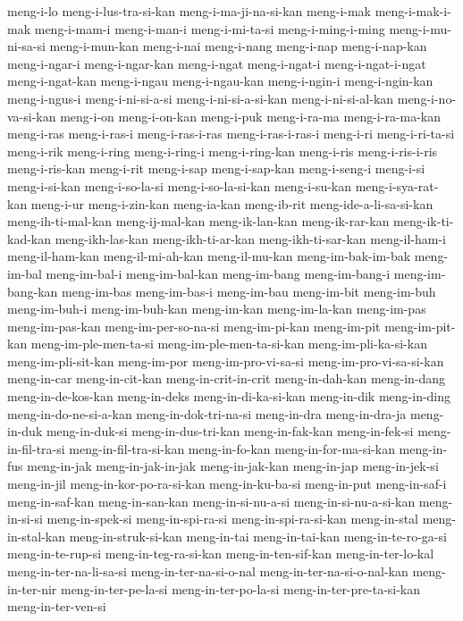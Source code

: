 {meng-i-lo meng-i-lus-tra-si-kan meng-i-ma-ji-na-si-kan meng-i-mak
meng-i-mak-i-mak meng-i-mam-i meng-i-man-i meng-i-mi-ta-si
meng-i-ming-i-ming meng-i-mu-ni-sa-si meng-i-mun-kan meng-i-nai
meng-i-nang meng-i-nap meng-i-nap-kan meng-i-ngar-i meng-i-ngar-kan
meng-i-ngat meng-i-ngat-i meng-i-ngat-i-ngat meng-i-ngat-kan meng-i-ngau
meng-i-ngau-kan meng-i-ngin-i meng-i-ngin-kan meng-i-ngus-i
meng-i-ni-si-a-si meng-i-ni-si-a-si-kan meng-i-ni-si-al-kan
meng-i-no-va-si-kan meng-i-on meng-i-on-kan meng-i-puk meng-i-ra-ma
meng-i-ra-ma-kan meng-i-ras meng-i-ras-i meng-i-ras-i-ras
meng-i-ras-i-ras-i meng-i-ri meng-i-ri-ta-si meng-i-rik meng-i-ring
meng-i-ring-i meng-i-ring-kan meng-i-ris meng-i-ris-i-ris meng-i-ris-kan
meng-i-rit meng-i-sap meng-i-sap-kan meng-i-seng-i meng-i-si meng-i-si-kan
meng-i-so-la-si meng-i-so-la-si-kan meng-i-su-kan meng-i-sya-rat-kan
meng-i-ur meng-i-zin-kan meng-ia-kan meng-ib-rit meng-ide-a-li-sa-si-kan
meng-ih-ti-mal-kan meng-ij-mal-kan meng-ik-lan-kan meng-ik-rar-kan
meng-ik-ti-kad-kan meng-ikh-las-kan meng-ikh-ti-ar-kan meng-ikh-ti-sar-kan
meng-il-ham-i meng-il-ham-kan meng-il-mi-ah-kan meng-il-mu-kan
meng-im-bak-im-bak meng-im-bal meng-im-bal-i meng-im-bal-kan meng-im-bang
meng-im-bang-i meng-im-bang-kan meng-im-bas meng-im-bas-i meng-im-bau
meng-im-bit meng-im-buh meng-im-buh-i meng-im-buh-kan meng-im-kan
meng-im-la-kan meng-im-pas meng-im-pas-kan meng-im-per-so-na-si
meng-im-pi-kan meng-im-pit meng-im-pit-kan meng-im-ple-men-ta-si
meng-im-ple-men-ta-si-kan meng-im-pli-ka-si-kan meng-im-pli-sit-kan
meng-im-por meng-im-pro-vi-sa-si meng-im-pro-vi-sa-si-kan meng-in-car
meng-in-cit-kan meng-in-crit-in-crit meng-in-dah-kan meng-in-dang
meng-in-de-kos-kan meng-in-deks meng-in-di-ka-si-kan meng-in-dik
meng-in-ding meng-in-do-ne-si-a-kan meng-in-dok-tri-na-si meng-in-dra
meng-in-dra-ja meng-in-duk meng-in-duk-si meng-in-dus-tri-kan
meng-in-fak-kan meng-in-fek-si meng-in-fil-tra-si meng-in-fil-tra-si-kan
meng-in-fo-kan meng-in-for-ma-si-kan meng-in-fus meng-in-jak
meng-in-jak-in-jak meng-in-jak-kan meng-in-jap meng-in-jek-si meng-in-jil
meng-in-kor-po-ra-si-kan meng-in-ku-ba-si meng-in-put meng-in-saf-i
meng-in-saf-kan meng-in-san-kan meng-in-si-nu-a-si meng-in-si-nu-a-si-kan
meng-in-si-si meng-in-spek-si meng-in-spi-ra-si meng-in-spi-ra-si-kan
meng-in-stal meng-in-stal-kan meng-in-struk-si-kan meng-in-tai
meng-in-tai-kan meng-in-te-ro-ga-si meng-in-te-rup-si
meng-in-teg-ra-si-kan meng-in-ten-sif-kan meng-in-ter-lo-kal
meng-in-ter-na-li-sa-si meng-in-ter-na-si-o-nal
meng-in-ter-na-si-o-nal-kan meng-in-ter-nir meng-in-ter-pe-la-si
meng-in-ter-po-la-si meng-in-ter-pre-ta-si-kan meng-in-ter-ven-si
}
